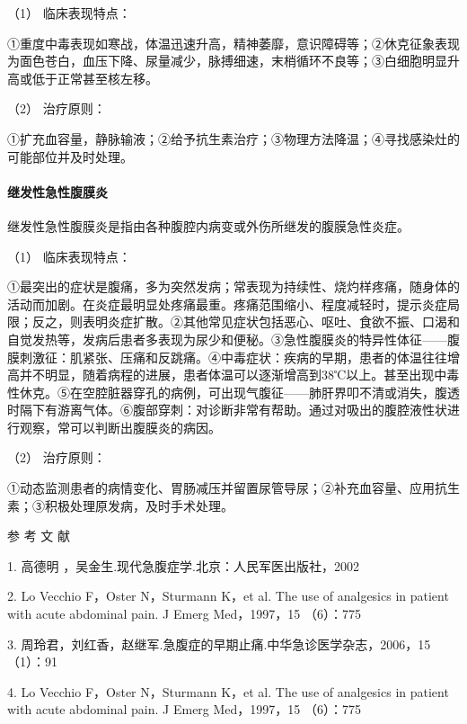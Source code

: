 \hypertarget{text00026.htmlux5cux23CHP1-10-3-2-2-1}{}
（1） 临床表现特点：

①重度中毒表现如寒战，体温迅速升高，精神萎靡，意识障碍等；②休克征象表现为面色苍白，血压下降、尿量减少，脉搏细速，末梢循环不良等；③白细胞明显升高或低于正常甚至核左移。

\hypertarget{text00026.htmlux5cux23CHP1-10-3-2-2-2}{}
（2） 治疗原则：

①扩充血容量，静脉输液；②给予抗生素治疗；③物理方法降温；④寻找感染灶的可能部位并及时处理。

\paragraph{继发性急性腹膜炎}

继发性急性腹膜炎是指由各种腹腔内病变或外伤所继发的腹膜急性炎症。

\hypertarget{text00026.htmlux5cux23CHP1-10-3-2-3-1}{}
（1） 临床表现特点：

①最突出的症状是腹痛，多为突然发病；常表现为持续性、烧灼样疼痛，随身体的活动而加剧。在炎症最明显处疼痛最重。疼痛范围缩小、程度减轻时，提示炎症局限；反之，则表明炎症扩散。②其他常见症状包括恶心、呕吐、食欲不振、口渴和自觉发热等，发病后患者多表现为尿少和便秘。③急性腹膜炎的特异性体征------腹膜刺激征：肌紧张、压痛和反跳痛。④中毒症状：疾病的早期，患者的体温往往增高并不明显，随着病程的进展，患者体温可以逐渐增高到38℃以上。甚至出现中毒性休克。⑤在空腔脏器穿孔的病例，可出现气腹征------肺肝界叩不清或消失，腹透时隔下有游离气体。⑥腹部穿刺：对诊断非常有帮助。通过对吸出的腹腔液性状进行观察，常可以判断出腹膜炎的病因。

\hypertarget{text00026.htmlux5cux23CHP1-10-3-2-3-2}{}
（2） 治疗原则：

①动态监测患者的病情变化、胃肠减压并留置尿管导尿；②补充血容量、应用抗生素；③积极处理原发病，及时手术处理。

\protect\hypertarget{text00027.html}{}{}

\hypertarget{text00027.htmlux5cux23CHP1-10-4}{}
参 考 文 献

1. 高德明 ，吴金生.现代急腹症学.北京：人民军医出版社，2002

2. Lo Vecchio F，Oster N，Sturmann K，et al. The use of analgesics in
patient with acute abdominal pain. J Emerg Med，1997，15 （6）：775

3.
周玲君，刘红香，赵继军.急腹症的早期止痛.中华急诊医学杂志，2006，15（1）：91

4. Lo Vecchio F，Oster N，Sturmann K，et al. The use of analgesics in
patient with acute abdominal pain. J Emerg Med，1997，15 （6）：775

